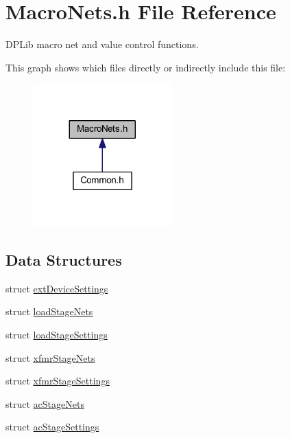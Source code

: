 \hypertarget{a00027}{\section{Macro\-Nets.\-h File Reference}
\label{a00027}
}


D\-P\-Lib macro net and value control functions.  


This graph shows which files directly or indirectly include this file\-:\nopagebreak
\begin{figure}[H]
\begin{center}
\leavevmode
\includegraphics[width=152pt]{a00066}
\end{center}
\end{figure}
\subsection*{Data Structures}
\begin{DoxyCompactItemize}
\item 
struct \hyperlink{a00005}{ext\-Device\-Settings}
\item 
struct \hyperlink{a00007}{load\-Stage\-Nets}
\item 
struct \hyperlink{a00008}{load\-Stage\-Settings}
\item 
struct \hyperlink{a00009}{xfmr\-Stage\-Nets}
\item 
struct \hyperlink{a00010}{xfmr\-Stage\-Settings}
\item 
struct \hyperlink{a00003}{ac\-Stage\-Nets}
\item 
struct \hyperlink{a00004}{ac\-Stage\-Settings}
\end{DoxyCompactItemize}

